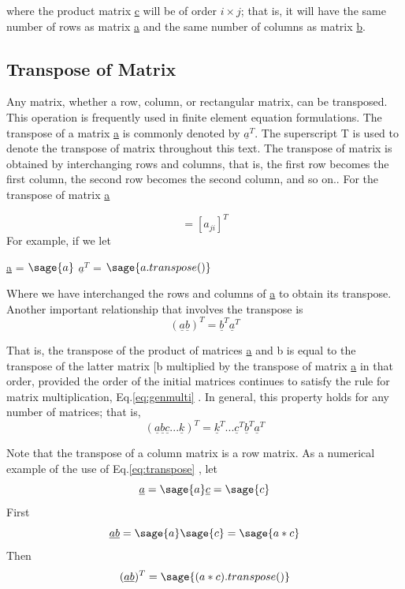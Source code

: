 \documentclass[12pt]{report}
\newcommand{\gen}[1]{
[#1_{{ij}}]
}
\newcommand{\lab}[1]{
Eq.\ref{#1}
}
\begin{document}
where the product matrix \underline{c} will be of order $i \times j$;
that is, it will have the same number of rows as matrix \underline{a}
and the same number of columns as matrix \underline{b}.

\subsection{Transpose of Matrix}
Any matrix, whether a row, column, or rectangular matrix, can be
transposed. This operation is frequently used in finite element
equation formulations. The transpose of a matrix \underline{a} is
commonly denoted by $\underline{a}^T$. The superscript T is used to
denote the transpose of matrix throughout this text. The transpose of
matrix is obtained by interchanging rows and columns, that is, the
first row becomes the first column, the second row becomes the second
column, and so on.. For the transpose of matrix \underline{a}

\begin{equation}\gen{a} =[a_{{ji}}]^T \end{equation}
For example, if we let
\begin{center}
\underline{a} = $\sage{a}$
$\underline{a}^T$ = $\sage{a.transpose()}$
\end{center}

Where we have interchanged the rows and columns of \underline{a} to
obtain its transpose.
Another important relationship that involves the
transpose is
\begin{equation} (\underline{a}\underline{b})^T = \underline{b}^T \underline{a}^T \label{eq:transpose}
\end{equation}

That is, the transpose of the product of matrices \underline{a} and
b is equal to the transpose of the latter matrix
[b multiplied by the transpose of matrix \underline{a} in
that order, provided the order of the initial matrices continues to
satisfy the rule for matrix multiplication,\lab{eq:genmulti}. In general,
this property holds for any number of matrices; that is,
\begin{equation}(\underline{a}\underline{b}\underline{c}...\underline{k})^T = \underline{k}^T... \underline{c}^T\underline{b}^T\underline{a}^T \end{equation} 

Note that the transpose of a column matrix is a row matrix. As a
numerical example of the use of \lab{eq:transpose}, let
$$\underline{a} = \sage{a}  \underline{c} = \sage{c}$$
First$$\underline{a}\underline{b} = \sage{a}\sage{c}=\sage{a*c}$$
Then \begin{equation}(\underline{a}\underline{b})^T= \sage{(a*c).transpose()}\label{eq:transeg1}\end{equation}
\end{document}
